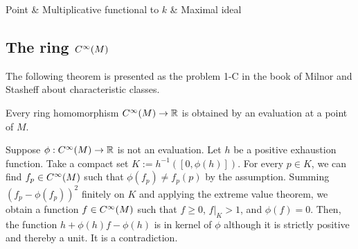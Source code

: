 \documentclass{../exp}
\begin{document}
\begin{rd}
Point  & Multiplicative functional to $k$  & Maximal ideal 
\end{rd}

\subsection{The ring $C^\infty(M)$}
The following theorem is presented as the problem 1-C in the book of Milnor and Stasheff about characteristic classes.
\begin{thm}
Every ring homomorphism $C^\oo(M)\to\R$ is obtained by an evaluation at a point of $M$.
\end{thm}
\begin{pf}
Suppose $\phi:C^\oo(M)\to\R$ is not an evaluation.
Let $h$ be a positive exhaustion function.
Take a compact set $K:=h^{-1}([0,\phi(h)])$.
For every $p\in K$, we can find $f_p\in C^\infty(M)$ such that $\phi(f_p)\ne f_p(p)$ by the assumption.
Summing $(f_p-\phi(f_p))^2$ finitely on $K$ and applying the extreme value theorem, we obtain a function $f\in C^\infty(M)$ such that $f\ge0$, $f|_K>1$, and $\phi(f)=0$.
Then, the function $h+\phi(h)f-\phi(h)$ is in kernel of $\phi$ although it is strictly positive and thereby a unit.
It is a contradiction.
\end{pf}
\end{document}
